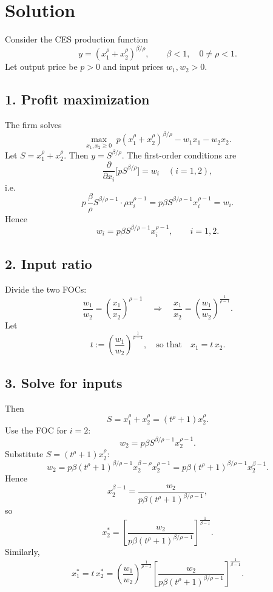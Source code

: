 \section*{Solution}

Consider the CES production function
\[
y=\left(x_1^\rho+x_2^\rho\right)^{\beta/\rho},
\qquad \beta<1,\quad 0\ne \rho<1.
\]
Let output price be \(p>0\) and input prices \(w_1,w_2>0\).

\subsection*{1. Profit maximization}

The firm solves
\[
\max_{x_1,x_2\ge 0}\; p\left(x_1^\rho+x_2^\rho\right)^{\beta/\rho}-w_1x_1-w_2x_2.
\]
Let \(S=x_1^\rho+x_2^\rho\). Then \(y=S^{\beta/\rho}\).
The first-order conditions are
\[
\frac{\partial}{\partial x_i}\bigl[p S^{\beta/\rho}\bigr]=w_i
\quad (i=1,2),
\]
i.e.
\[
p\,\frac{\beta}{\rho}S^{\beta/\rho-1}\cdot \rho x_i^{\rho-1}
=
p\beta S^{\beta/\rho-1}x_i^{\rho-1}
=
w_i.
\]
Hence
\[
w_i=p\beta S^{\beta/\rho-1}x_i^{\rho-1},\qquad i=1,2.
\]

\subsection*{2. Input ratio}

Divide the two FOCs:
\[
\frac{w_1}{w_2}=\left(\frac{x_1}{x_2}\right)^{\rho-1}
\quad\Rightarrow\quad
\frac{x_1}{x_2}
=
\left(\frac{w_1}{w_2}\right)^{\frac{1}{\rho-1}}.
\]
Let
\[
t:=\left(\frac{w_1}{w_2}\right)^{\frac{1}{\rho-1}},
\quad\text{so that}\quad x_1=t\,x_2.
\]

\subsection*{3. Solve for inputs}

Then
\[
S=x_1^\rho+x_2^\rho=(t^\rho+1)x_2^\rho.
\]
Use the FOC for \(i=2\):
\[
w_2=p\beta S^{\beta/\rho-1}x_2^{\rho-1}.
\]
Substitute \(S=(t^\rho+1)x_2^\rho\):
\[
w_2=p\beta (t^\rho+1)^{\beta/\rho-1}x_2^{\beta-\rho}x_2^{\rho-1}
=
p\beta (t^\rho+1)^{\beta/\rho-1}x_2^{\beta-1}.
\]
Hence
\[
x_2^{\beta-1}
=
\frac{w_2}{p\beta (t^\rho+1)^{\beta/\rho-1}},
\]
so
\[
x_2^*
=
\left[
\frac{w_2}{p\beta (t^\rho+1)^{\beta/\rho-1}}
\right]^{\frac{1}{\beta-1}}.
\]
Similarly,
\[
x_1^*
=
t\,x_2^*
=
\left(\frac{w_1}{w_2}\right)^{\frac{1}{\rho-1}}
\left[
\frac{w_2}{p\beta (t^\rho+1)^{\beta/\rho-1}}
\right]^{\frac{1}{\beta-1}}.
\]


